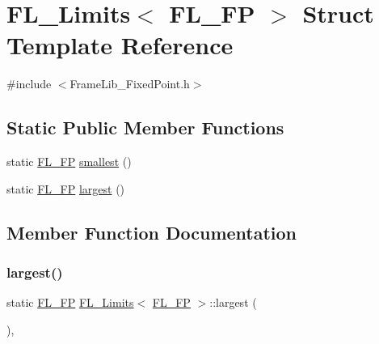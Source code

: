 \hypertarget{struct_f_l___limits_3_01_f_l___f_p_01_4}{}\section{F\+L\+\_\+\+Limits$<$ F\+L\+\_\+\+FP $>$ Struct Template Reference}
\label{struct_f_l___limits_3_01_f_l___f_p_01_4}


{\ttfamily \#include $<$Frame\+Lib\+\_\+\+Fixed\+Point.\+h$>$}

\subsection*{Static Public Member Functions}
\begin{DoxyCompactItemize}
\item 
static \hyperlink{class_f_l___f_p}{F\+L\+\_\+\+FP} \hyperlink{struct_f_l___limits_3_01_f_l___f_p_01_4_abbe30add075e57d481380848b101b1d5}{smallest} ()
\item 
static \hyperlink{class_f_l___f_p}{F\+L\+\_\+\+FP} \hyperlink{struct_f_l___limits_3_01_f_l___f_p_01_4_a7f91e6801d36f295cf6485a0f8c04aee}{largest} ()
\end{DoxyCompactItemize}


\subsection{Member Function Documentation}
\mbox{\label{struct_f_l___limits_3_01_f_l___f_p_01_4_a7f91e6801d36f295cf6485a0f8c04aee}} 
\subsubsection{\texorpdfstring{largest()}{largest()}}
{\footnotesize\ttfamily static \hyperlink{class_f_l___f_p}{F\+L\+\_\+\+FP} \hyperlink{struct_f_l___limits}{F\+L\+\_\+\+Limits}$<$ \hyperlink{class_f_l___f_p}{F\+L\+\_\+\+FP} $>$\+::largest (\begin{DoxyParamCaption}{ }\end{DoxyParamCaption})\hspace{0.3cm}{\ttfamily [inline]}, {\ttfamily [static]}}

